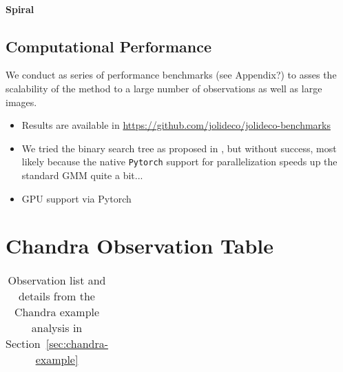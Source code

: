 \documentclass[twocolumn]{aastex631}
\begin{document}
    \paragraph{Spiral}

    \subsection{Computational Performance}
    We conduct as series of performance benchmarks (see Appendix?) to asses the scalability of the method to a large number of observations as well as large images. 

    \begin{itemize}
        \item Results are available in \url{https://github.com/jolideco/jolideco-benchmarks}
        \item We tried the binary search tree as proposed in \cite{Parameswaran2018},
        but without success, most likely because the native \texttt{Pytorch} support
        for parallelization speeds up the standard GMM quite a bit...
        \item GPU support via Pytorch
    \end{itemize}


    \section{Chandra Observation Table}
    
    \begin{table}
    \centering
        \begin{tabular}{ c|c|c|c } 
            
        \end{tabular}
        \label{tab:chandra_obs}
        \caption{Observation list and details from the Chandra example analysis in Section~\ref{sec:chandra-example}}
    \end{table}
    
\end{document}
